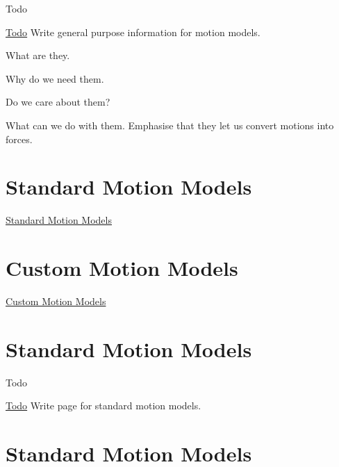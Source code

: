 \begin{DoxyRefDesc}{Todo}
\item[\hyperlink{todo__todo000015}{Todo}]Write general purpose information for motion models.
\begin{DoxyItemize}
\item What are they.
\item Why do we need them.
\item Do we care about them?
\item What can we do with them. Emphasise that they let us convert motions into forces.
\end{DoxyItemize}\end{DoxyRefDesc}


\section*{Standard Motion Models}

\hyperlink{standard_motion_models}{Standard Motion Models}

\section*{Custom Motion Models}

\hyperlink{custom_motion_models}{Custom Motion Models} \hypertarget{standard_motion_models}{}\section{Standard Motion Models}\label{standard_motion_models}
\begin{DoxyRefDesc}{Todo}
\item[\hyperlink{todo__todo000042}{Todo}]Write page for standard motion models.\end{DoxyRefDesc}


\section*{Standard Motion Models}

